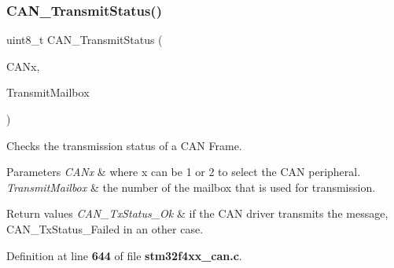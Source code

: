\mbox{\label{group__CAN__Group2_ga68ab05a0a6cdfcc2b6f6b6b2c10848e2}} 
\subsubsection{C\+A\+N\+\_\+\+Transmit\+Status()}
{\footnotesize\ttfamily uint8\+\_\+t C\+A\+N\+\_\+\+Transmit\+Status (\begin{DoxyParamCaption}\item[{\textbf{ C\+A\+N\+\_\+\+Type\+Def} $\ast$}]{C\+A\+Nx,  }\item[{uint8\+\_\+t}]{Transmit\+Mailbox }\end{DoxyParamCaption})}



Checks the transmission status of a C\+AN Frame. 


\begin{DoxyParams}{Parameters}
{\em C\+A\+Nx} & where x can be 1 or 2 to select the C\+AN peripheral. \\
\hline
{\em Transmit\+Mailbox} & the number of the mailbox that is used for transmission. \\
\hline
\end{DoxyParams}

\begin{DoxyRetVals}{Return values}
{\em C\+A\+N\+\_\+\+Tx\+Status\+\_\+\+Ok} & if the C\+AN driver transmits the message, C\+A\+N\+\_\+\+Tx\+Status\+\_\+\+Failed in an other case. \\
\hline
\end{DoxyRetVals}


Definition at line \textbf{ 644} of file \textbf{ stm32f4xx\+\_\+can.\+c}.


